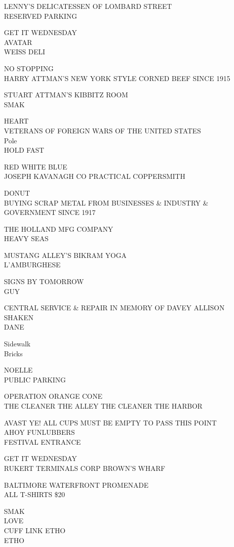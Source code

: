 \documentclass[10pt,letterpaper]{article}
\begin{document}
LENNY'S DELICATESSEN OF LOMBARD STREET\\
RESERVED PARKING

GET IT WEDNESDAY\\
AVATAR\\
WEISS DELI

NO STOPPING\\
HARRY ATTMAN'S NEW YORK STYLE CORNED BEEF SINCE 1915

STUART ATTMAN'S KIBBITZ ROOM\\
SMAK

HEART\\
VETERANS OF FOREIGN WARS OF THE UNITED STATES\\
Pole\\
HOLD FAST

RED WHITE BLUE\\
JOSEPH KAVANAGH CO PRACTICAL COPPERSMITH

DONUT\\
BUYING SCRAP METAL FROM BUSINESSES \& INDUSTRY \& GOVERNMENT SINCE 1917

THE HOLLAND MFG COMPANY\\
HEAVY SEAS

MUSTANG ALLEY'S BIKRAM YOGA\\
L'AMBURGHESE

SIGNS BY TOMORROW\\
GUY

CENTRAL SERVICE \& REPAIR IN MEMORY OF DAVEY ALLISON\\
SHAKEN\\
DANE

Sidewalk\\
Bricks

NOELLE\\
PUBLIC PARKING

OPERATION ORANGE CONE\\
THE CLEANER THE ALLEY THE CLEANER THE HARBOR

AVAST YE! ALL CUPS MUST BE EMPTY TO PASS THIS POINT\\
AHOY FUNLUBBERS\\
FESTIVAL ENTRANCE

GET IT WEDNESDAY\\
RUKERT TERMINALS CORP BROWN'S WHARF

BALTIMORE WATERFRONT PROMENADE\\
ALL T{-}SHIRTS \$20

SMAK\\
LOVE\\
CUFF LINK ETHO\\
ETHO
\end{document}

